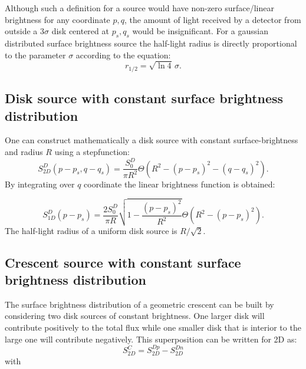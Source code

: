 \documentclass[usenatbib]{mn2e}
\begin{document}
Although such a definition for a source would have non-zero surface/linear brightness for any coordinate $p,q$, the amount of light received by a detector from outside a $3 \sigma$ disk centered at $p_s, q_s$ 
would be insignificant. For a gaussian distributed surface brightness source the half-light radius is directly proportional to the parameter $\sigma$ according to the equation:
\begin{equation}
r_{1/2} = \sqrt{\ln4}\,\sigma.
\end{equation}

\subsection{Disk source with constant surface brightness distribution}

One can construct mathematically a disk source with constant surface-brightness and radius $R$ using a stepfunction:
\begin{equation}
 S_{2D}^D(p-p_s, q-q_s) = \frac{S_0^D}{\pi R^2} \Theta \left( R^2 - \left( p-p_s \right)^2 - \left( q-q_s \right)^2 \right).
\end{equation}
By integrating over $q$ coordinate the linear brightness function is obtained:


\begin{equation}
 S_{1D}^D(p-p_s) = \frac{2 S_0^D}{\pi R}  \sqrt{1 - \frac{(p-p_s)^2}{R^2} }    \Theta \left( R^2 - \left( p-p_s \right)^2 \right).
\end{equation}
The half-light radius of a uniform disk source is $R/\sqrt{2}$.

\subsection{Crescent source with constant surface brightness distribution}\label{subsec:crescent}

The surface brightness distribution of a geometric crescent can be built 
by considering two disk sources of constant brightness. One larger disk 
will contribute positively to the total flux while one smaller disk 
that is interior to the large one will contribute negatively. This superposition can be written for 2D as:\\

\begin{equation}
 S_{2D}^C =  S_{2D}^{Dp} -  S_{2D}^{Dn}  
 \label{eqn:s2d}
\end{equation}
with\\
\end{document}
